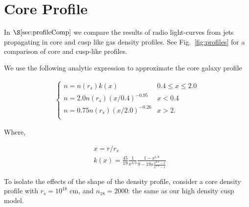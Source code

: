 \documentclass[usenatbib,fleqn]{mnras}
\begin{document}
\appendix
\section{Core Profile}
\label{app:core}
In $\S\ref{sec:profileComp}$ we compare the results of radio
light-curves from jets propagating in core and cusp like gas density
profiles. See Fig.~\ref{fig:profiles} for a comparison of core and
cusp-like profiles. 

We use the following analytic expression to approximate the core
galaxy profile

\begin{align}
\begin{cases}
n=n(r_s) k(x) & 0.4 \leq x\leq 2.0\\
n = 2.0 n(r_s) (x/0.4)^{-0.95} & x < 0.4\\
n = 0.75 n(r_s) (x/2.0)^{-0.26} & x>2.\\
\end{cases}
\label{eq:cores}
\end{align}

Where, 

\begin{align}
  &x=r/r_s\\\nonumber
  &k(x)=\frac{45}{19} \frac{1}{x^{3/2}} \frac{1-x^{1.9}}{9-19
      x\frac{x^{0.9}-1}{x^{1.9}-1}}
\end{align}

To isolate the effects of the shape of the density profile, consider a
core density profile with $r_s=10^{18}$ cm, and $n_{18}=2000$: the
same as our high density cusp model.

\clearpage
  \footnotesize{
    
    
  }
\end{document}

